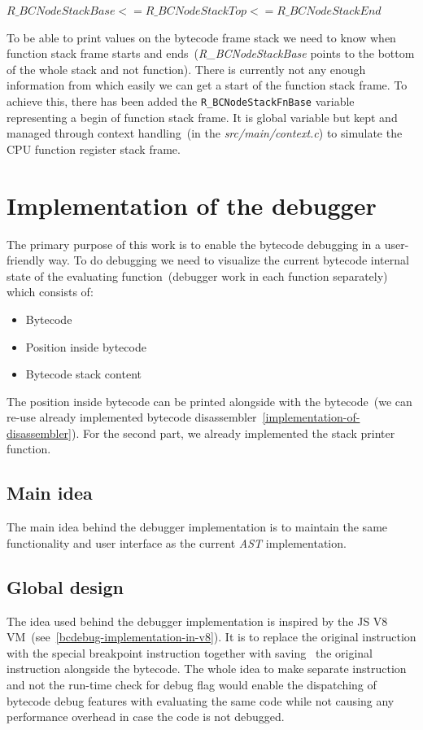 \documentclass[thesis=M,english]{FITthesis}[2018/10/20]
\newcommand{\code}[1]{\texttt{#1}}
\begin{document}
$R{\_}BCNodeStackBase <= R{\_}BCNodeStackTop <= R{\_}BCNodeStackEnd$


To be able to print values on the bytecode frame stack we need to know when function stack frame starts and ends~(\textit{R{\_}BCNodeStackBase} points to the bottom of the whole stack and not function). There is currently not any enough information from which easily we can get a start of the function stack frame. To achieve this, there has been added the \code{R{\_}BCNodeStackFnBase} variable representing a begin of function stack frame. It is global variable but kept and managed through context handling~(in the \textit{src/main/context.c}) to simulate the CPU function register stack frame.

\section{Implementation of the debugger}\label{implementation-of-debugger}

The primary purpose of this work is to enable the bytecode debugging in a user-friendly way. To do debugging we need to visualize the current bytecode internal state of the evaluating function~(debugger work in each function separately) which consists of:

\begin{itemize}
	\item Bytecode
	\item Position inside bytecode
	\item Bytecode stack content
\end{itemize}

The position inside bytecode can be printed alongside with the bytecode~(we can re-use already implemented bytecode disassembler~\ref{implementation-of-disassembler}). For the second part, we already implemented the stack printer function.

\subsection{Main idea}

The main idea behind the debugger implementation is to maintain the same functionality and user interface as the current \textit{AST} implementation.

\subsection{Global design}

The idea used behind the debugger implementation is inspired by the JS V8 VM~(see~\ref{bcdebug-implementation-in-v8}). It is to replace the original instruction with the special breakpoint instruction together with saving~ the original instruction alongside the bytecode. The whole idea to make separate instruction and not the run-time check for debug flag would enable the dispatching of bytecode debug features with evaluating the same code while not causing any performance overhead in case the code is not debugged.
\end{document}
